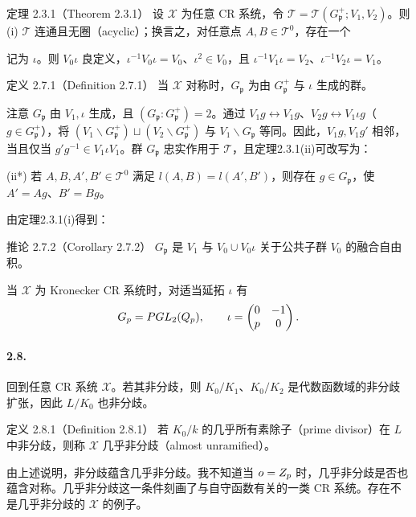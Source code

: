 \begin{originaltheorem}{定理 2.3.1（Theorem 2.3.1）}
设 $\mathcal X$ 为任意 CR 系统，令 $\mathcal T=\mathcal T(G_{\mathfrak p}^+;V_1,V_2)$。则(i) $\mathcal T$ 连通且无圈（acyclic）；换言之，对任意点 $A,B\in\mathcal T^0$，存在一个

记为 $\iota$。则 $V_0\iota$ 良定义，$\iota^{-1}V_0\iota=V_0$、$\iota^2\in V_0$，且
$\iota^{-1}V_1\iota=V_2$、$\iota^{-1}V_2\iota=V_1$。

\begin{originaltheorem}{定义 2.7.1（Definition 2.7.1）}
当 $\mathcal X$ 对称时，$G_{\mathfrak p}$ 为由 $G_{\mathfrak p}^+$ 与 $\iota$ 生成的群。
\end{originaltheorem}
注意 $G_{\mathfrak p}$ 由 $V_1,\iota$ 生成，且 $(G_{\mathfrak p}:G_{\mathfrak p}^+)=2$。通过
$V_1g\leftrightarrow V_1g$、$V_2g\leftrightarrow V_1\iota g$（$g\in G_{\mathfrak p}^+$），将 $(V_1\backslash G_{\mathfrak p}^+)\sqcup(V_2\backslash G_{\mathfrak p}^+)$ 与 $V_1\backslash G_{\mathfrak p}$ 等同。因此，$V_1g,V_1g'$ 相邻，当且仅当 $g'g^{-1}\in V_1\iota V_1$。群 $G_{\mathfrak p}$ 忠实作用于 $\mathcal T$，且定理2.3.1(ii)可改写为：

(ii*) 若 $A,B,A',B'\in\mathcal T^0$ 满足 $l(A,B)=l(A',B')$，则存在 $g\in G_{\mathfrak p}$，使 $A'=Ag$、$B'=Bg$。

由定理2.3.1(i)得到：
\begin{originaltheorem}{推论 2.7.2（Corollary 2.7.2）}
$G_{\mathfrak p}$ 是 $V_1$ 与 $V_0\cup V_0\iota$ 关于公共子群 $V_0$ 的融合自由积。
\end{originaltheorem}
当 $\mathcal X$ 为 Kronecker CR 系统时，对适当延拓 $\iota$ 有
\[
 G_{p}=PGL_2(Q_p),\qquad
 \iota=\begin{pmatrix}0&-1\\p&0\end{pmatrix}.
\]

\paragraph*{2.8.}
回到任意 CR 系统 $\mathcal X$。若其非分歧，则 $K_0/K_1$、$K_0/K_2$ 是代数函数域的非分歧扩张，因此 $L/K_0$ 也非分歧。
\begin{originaltheorem}{定义 2.8.1（Definition 2.8.1）}
若 $K_0/k$ 的几乎所有素除子（prime divisor）在 $L$ 中非分歧，则称 $\mathcal X$ 几乎非分歧（almost unramified）。
\end{originaltheorem}
由上述说明，非分歧蕴含几乎非分歧。我不知道当 $o=Z_p$ 时，几乎非分歧是否也蕴含对称。几乎非分歧这一条件刻画了与自守函数有关的一类 CR 系统。存在不是几乎非分歧的 $\mathcal X$ 的例子。


\end{originaltheorem}
